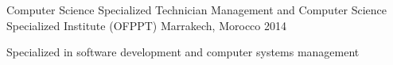 

\begin{cventries}

\cventry
{Computer Science Specialized Technician} %
{Management and Computer Science Specialized Institute (OFPPT)} %
{Marrakech, Morocco} %
{2014} %
{
  \begin{cvitems} %
    \item {Specialized in software development and computer systems management}
  \end{cvitems}
}

\end{cventries}
